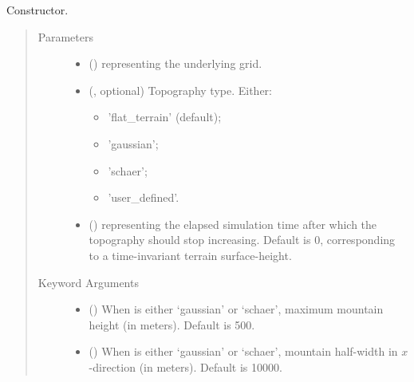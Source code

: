 \documentclass[letterpaper,10pt,english]{sphinxmanual}
\begin{document}
\begin{fulllineitems}
\begin{fulllineitems}
\label{\detokenize{api:grids.topography.Topography2d.__init__}}
Constructor.
\begin{quote}\begin{description}
\item[{Parameters}] \leavevmode\begin{itemize}
\item {} 
 () \textendash{} {\hyperref[\detokenize{api:grids.grid_xy.GridXY}]{}} representing the underlying grid.

\item {} 
 (, optional) \textendash{} 
Topography type. Either:
\begin{itemize}
\item {} 
’flat\_terrain’ (default);

\item {} 
’gaussian’;

\item {} 
’schaer’;

\item {} 
’user\_defined’.

\end{itemize}


\item {} 
 () \textendash{}  representing the elapsed simulation time after which the topography
should stop increasing. Default is 0, corresponding to a time-invariant terrain surface-height.

\end{itemize}

\item[{Keyword Arguments}] \leavevmode\begin{itemize}
\item {} 
 () \textendash{} When  is either ‘gaussian’ or ‘schaer’, maximum mountain height (in meters).
Default is 500.

\item {} 
 () \textendash{} When  is either ‘gaussian’ or ‘schaer’, mountain half-width in \(x\)-direction
(in meters). Default is 10000.


\end{itemize}
\end{description}
\end{quote}
\end{fulllineitems}
\end{fulllineitems}
\end{document}
